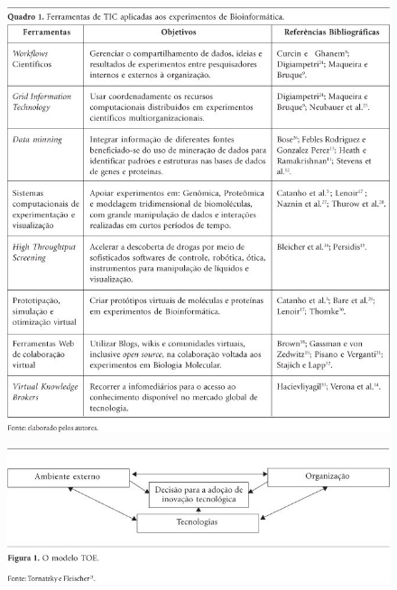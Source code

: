 \documentclass{article}
\begin{document}
\begin{figure}
\includegraphics[width=\textwidth]{1413-8123-csc-19-01-00257-gf01}
\caption{}\label{fig:f01}

\end{figure}
\begin{figure}
\includegraphics[width=\textwidth]{1413-8123-csc-19-01-00257-gf02}

\caption{}\label{fig:f02}
\end{figure}
\end{document}
